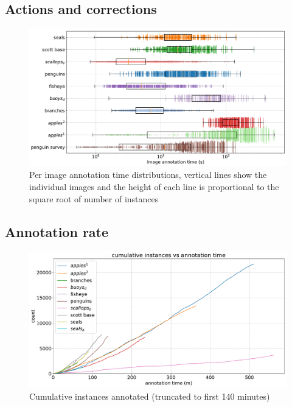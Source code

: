 \begin{figure}[ht]
\label{fig:actions_dataset}
\end{figure}


\subsection {Actions and corrections}

\begin{figure}[ht]
\centering
\includegraphics[width=1.0\linewidth]{charts/summaries/duration_boxplot.pdf}
\caption{ Per image annotation time distributions, vertical lines show the individual images and the height of each line is proportional to the square root of number of instances }
\label{fig:duration_boxplot}
\end{figure}




\subsection{Annotation rate}

\begin{figure}[ht]
\centering
\includegraphics[width=1.0\linewidth]{charts/summaries/cumulative_instances.pdf}
\caption{ Cumulative instances annotated (truncated to first 140 minutes)  }
\label{fig:duration_boxplot}
\end{figure}





